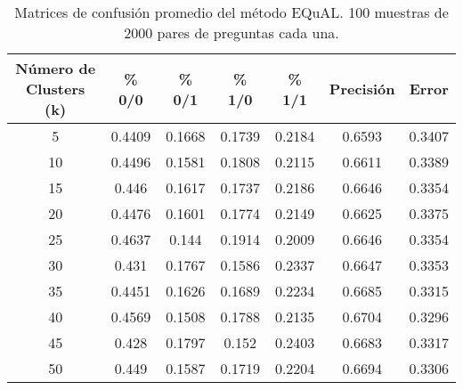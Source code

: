 \begin{table}[]
	\centering
	\begin{tabular}{|c|c|c|c|c|c|c|}
		\hline
		\rowcolor[HTML]{CFE2F3}
		\textbf{Número de Clusters (k)} & \textbf{\% 0/0} & \textbf{\% 0/1} & \textbf{\% 1/0} & \textbf{\% 1/1} & \textbf{Precisión} & \textbf{Error} \\ \hline
		5  & 0.4409 & 0.1668 & 0.1739 & 0.2184 & 0.6593 & 0.3407 \\ \hline
		10 & 0.4496 & 0.1581 & 0.1808 & 0.2115 & 0.6611 & 0.3389 \\ \hline
		15 & 0.446  & 0.1617 & 0.1737 & 0.2186 & 0.6646 & 0.3354 \\ \hline
		20 & 0.4476 & 0.1601 & 0.1774 & 0.2149 & 0.6625 & 0.3375 \\ \hline
		25 & 0.4637 & 0.144  & 0.1914 & 0.2009 & 0.6646 & 0.3354 \\ \hline
		30 & 0.431  & 0.1767 & 0.1586 & 0.2337 & 0.6647 & 0.3353 \\ \hline
		35 & 0.4451 & 0.1626 & 0.1689 & 0.2234 & 0.6685 & 0.3315 \\ \hline
		40 & 0.4569 & 0.1508 & 0.1788 & 0.2135 & 0.6704 & 0.3296 \\ \hline
		45 & 0.428  & 0.1797 & 0.152  & 0.2403 & 0.6683 & 0.3317 \\ \hline
		\rowcolor[HTML]{D9EAD3}
		50 & 0.449  & 0.1587 & 0.1719 & 0.2204 & 0.6694 & 0.3306 \\ \hline
	\end{tabular}
	\caption{Matrices de confusión promedio del método EQuAL. 100 muestras de 2000 pares de preguntas cada una. }
	\label{tab:analisis-100-2000}
\end{table}

